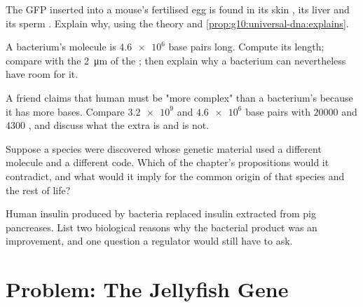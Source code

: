 \begin{exercise}[$\star\star$]\label{exo:g10:universal-dna:11}
The GFP  inserted into a mouse's fertilised egg is found in its
skin , its liver  and its sperm . Explain why, using
the  theory and \cref{prop:g10:universal-dna:explains}.
\end{exercise}

\begin{exercise}[$\star\star\star$]\label{exo:g10:universal-dna:12}
A bacterium's  molecule is $\num{4.6e6}$ base pairs long. Compute
its length; compare with the \qty{2}{\micro m} of the ; then
explain why a bacterium can nevertheless have room for it.
\end{exercise}

\begin{exercise}[$\star\star\star$]\label{exo:g10:universal-dna:13}
A friend claims that human  must be "more complex" than a
bacterium's because it has more bases. Compare $\num{3.2e9}$ and
$\num{4.6e6}$ base pairs with $\num{20000}$ and 4300 , and discuss
what the extra  is and is not.
\end{exercise}

\begin{exercise}[$\star\star\star$]\label{exo:g10:universal-dna:14}
Suppose a species were discovered whose genetic material used a
different molecule and a different code. Which of the chapter's
propositions would it contradict, and what would it imply for the
common origin of that species and the rest of life?
\end{exercise}

\begin{exercise}[$\star\star\star$]\label{exo:g10:universal-dna:15}
Human insulin produced by bacteria replaced insulin extracted from pig
pancreases. List two biological reasons why the bacterial product was
an improvement, and one question a regulator would still have to ask.
\end{exercise}

\section{Problem: The Jellyfish Gene}

